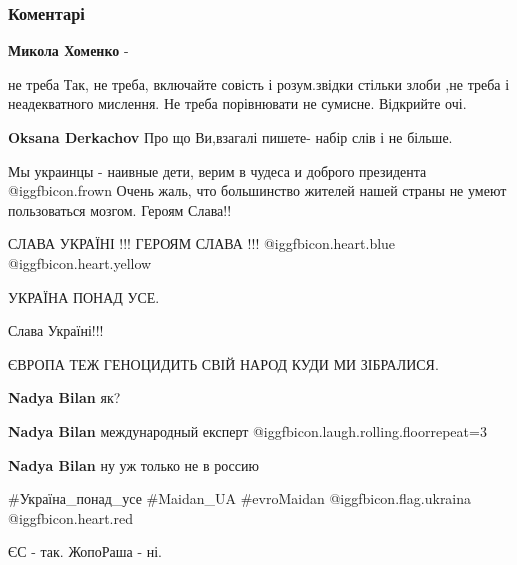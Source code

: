  
 
 
 
 
\subsubsection{Коментарі}
\label{sec:21_11_2021.fb.smolij_andrij.1.my_ukrainci.cmt}

\begin{itemize} %
\textbf{Микола Хоменко} - 

не треба Так, не треба, включайте совість і розум.звідки стільки злоби ,не
треба і неадекватного мислення. Не треба порівнювати не сумисне. Відкрийте
очі.

\textbf{Oksana Derkachov} Про що Ви,взагалі пишете- набір слів і не більше.

Мы украинцы - наивные дети, верим в чудеса и доброго президента  @igg{fbicon.frown} 
Очень жаль, что большинство жителей нашей страны не умеют пользоваться мозгом.
Героям Слава!!

СЛАВА УКРАЇНІ !!!
ГЕРОЯМ СЛАВА !!!  @igg{fbicon.heart.blue}  @igg{fbicon.heart.yellow} 

УКРАЇНА ПОНАД УСЕ.

Слава Україні!!!

ЄВРОПА ТЕЖ ГЕНОЦИДИТЬ СВІЙ НАРОД КУДИ МИ ЗІБРАЛИСЯ.

\begin{itemize} %
\textbf{Nadya Bilan} як?

\textbf{Nadya Bilan} международный експерт  @igg{fbicon.laugh.rolling.floor}{repeat=3} 

\textbf{Nadya Bilan} ну уж только не в россию
\end{itemize} %

\#Україна\_понад\_усе \#Maidan\_UA \#evroMaidan @igg{fbicon.flag.ukraina} @igg{fbicon.heart.red}

ЄС - так. ЖопоРаша - ні.



\end{itemize}
